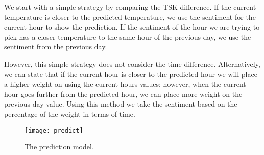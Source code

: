 We start with a simple strategy by comparing the TSK difference. If the current temperature is closer to the predicted temperature, we use the sentiment for the current hour to show the prediction. If the sentiment of the hour we are trying to pick has a closer temperature to the same hour of the previous day, we use the sentiment from the previous day.

However, this simple strategy does not consider the time difference. Alternatively, we can state that if the current hour is closer to the predicted hour we will place a higher weight on using the current hours values; however, when the current hour goes further from the predicted hour, we can place more weight on the previous day value. %
Using this method we take the sentiment based on the percentage of the weight in terms of time.


\begin{figure}[t]
\begin{center}
\texttt{[image: predict]}
\end{center}
\vspace{-.1in}
\caption{The prediction model.}
\label{fig:predict-model}
\end{figure}

